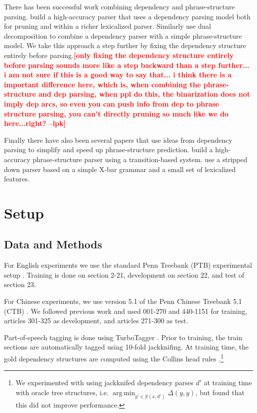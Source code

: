 \documentclass[11pt,letterpaper]{article}
\DeclareMathOperator*{\argmin}{arg\,min}
\newcommand{\lpkcomment}[1]{\textcolor{red}{\bf \small [#1 --lpk]}}
\begin{document}
There has been successful work combining dependency and phrase-structure parsing.  build a
high-accuracy parser that uses a dependency parsing model both for
pruning and within a richer lexicalized parser. Similarly
 use dual decomposition to combine a dependency
parser with a simple phrase-structure model. We take this
approach a step further by fixing the dependency structure
entirely before parsing.\lpkcomment{only fixing the dependency structure
entirely before parsing sounds more like a step backward than a step further... i am not sure if this is a good way to say that... i think there is a important difference here, which is, when combining the phrase-structure and dep parsing, when ppl do this, the binarization does not imply dep arcs, so even you can push info from dep to phrase structure parsing, you can't directly pruning so much like we do here...right?}


Finally there have also been several papers that use ideas from
dependency parsing to simplify and speed up phrase-structure prediction.
 build a high-accuracy phrase-structure parser
using a transition-based system.  use a stripped
down parser based on a simple X-bar grammar and a small set of lexicalized features.

\section{Setup}


\subsection{Data and Methods}

For English experiments we use the standard Penn Treebank (PTB)
experimental setup \cite{marcus1993building}. Training is done on
section 2-21, development on section 22, and test of section 23.

For Chinese experiments, we use version 5.1 of the Penn  Chinese Treebank 5.1 (CTB) \cite{xue2005penn}. We followed previous work and used
001-270 and 440-1151 for training, articles
301-325 as development, and articles
271-300 as test.

Part-of-speech tagging is done using TurboTagger
\cite{martins2013turning}. Prior to training, the train sections are
automatically tagged using 10-fold jackknifing. At training time, the
gold dependency structures are computed using the Collins head rules
\cite{collins2003head}.\footnote{ We experimented with using
  jackknifed dependency parses $d'$ at training time with oracle tree
  structures, i.e. $\argmin_{y' \in \mathcal{Y}(x, d')} \Delta(y, y)$,
  but found that this did not improve performance.}
\end{document}

